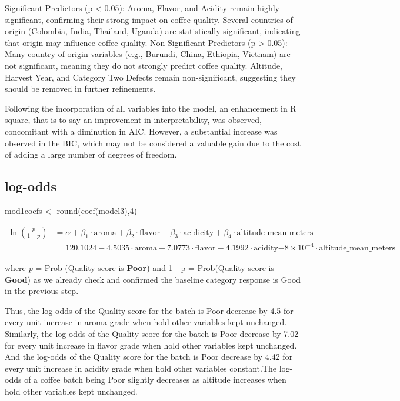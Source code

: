 \documentclass[
  letterpaper,
  DIV=11,
  numbers=noendperiod]{scrartcl}
\newenvironment{Shaded}{\begin{snugshade}}{\end{snugshade}}
\newcommand{\DecValTok}[1]{\textcolor[rgb]{0.68,0.00,0.00}{#1}}
\newcommand{\FunctionTok}[1]{\textcolor[rgb]{0.28,0.35,0.67}{#1}}
\newcommand{\NormalTok}[1]{\textcolor[rgb]{0.00,0.23,0.31}{#1}}
\newcommand{\OtherTok}[1]{\textcolor[rgb]{0.00,0.23,0.31}{#1}}
\begin{document}
Significant Predictors (p \textless{} 0.05): Aroma, Flavor, and Acidity
remain highly significant, confirming their strong impact on coffee
quality. Several countries of origin (Colombia, India, Thailand, Uganda)
are statistically significant, indicating that origin may influence
coffee quality. Non-Significant Predictors (p \textgreater{} 0.05): Many
country of origin variables (e.g., Burundi, China, Ethiopia, Vietnam)
are not significant, meaning they do not strongly predict coffee
quality. Altitude, Harvest Year, and Category Two Defects remain
non-significant, suggesting they should be removed in further
refinements.

Following the incorporation of all variables into the model, an
enhancement in R square, that is to say an improvement in
interpretability, was observed, concomitant with a diminution in AIC.
However, a substantial increase was observed in the BIC, which may not
be considered a valuable gain due to the cost of adding a large number
of degrees of freedom.

\subsection{log-odds}\label{log-odds}

\begin{Shaded}
\begin{Highlighting}[]
\NormalTok{mod1coefs }\OtherTok{\textless{}{-}} \FunctionTok{round}\NormalTok{(}\FunctionTok{coef}\NormalTok{(model3),}\DecValTok{4}\NormalTok{)}
\end{Highlighting}
\end{Shaded}

\begin{align}
\ln\left(\frac{p}{1-p}\right) &= \alpha + \beta_1 \cdot \textrm{aroma} +\beta_2 \cdot \textrm{flavor} + \beta_3 \cdot \textrm{acidicity} + \beta_4 \cdot \textrm{altitude\_mean\_meters}\nonumber\\
&= 120.1024  -4.5035 \cdot \textrm{aroma}-7.0773 \cdot \textrm{flavor} -4.1992 \cdot \textrm{acidity} \ensuremath{-8\times 10^{-4}} \cdot \textrm{altitude\_mean\_meters} \nonumber
\end{align}

where \emph{p} = Prob (Quality score is \textbf{Poor}) and 1 - p =
Prob(Quality score is \textbf{Good}) as we already check and confirmed
the baseline category response is Good in the previous step.

Thus, the log-odds of the Quality score for the batch is Poor decrease
by 4.5 for every unit increase in aroma grade when hold other variables
kept unchanged. Similarly, the log-odds of the Quality score for the
batch is Poor decrease by 7.02 for every unit increase in flavor grade
when hold other variables kept unchanged. And the log-odds of the
Quality score for the batch is Poor decrease by 4.42 for every unit
increase in acidity grade when hold other variables constant.The
log-odds of a coffee batch being Poor slightly decreases as altitude
increases when hold other variables kept unchanged.
\end{document}
